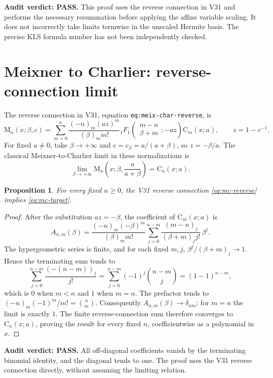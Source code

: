 \documentclass[11pt]{article}
\newtheorem{proposition}{Proposition}
\begin{document}
\noindent\textbf{Audit verdict: PASS.} This proof uses the reverse
connection in V31 and performs the necessary resummation before
applying the affine variable scaling. It does not incorrectly take
limits termwise in the unscaled Hermite basis. The precise KLS
formula number has not been independently checked.


\section{Meixner to Charlier: reverse-connection limit}
The reverse connection in V31, equation \texttt{eq:meix-char-reverse}, is
\begin{equation}\label{eq:mc-reverse}
\mathrm M_n(x;\beta,c)=\sum_{m=0}^n
\frac{(-n)_m(az)^m}{(\beta)_m m!}
{}_1F_1\!\left(\begin{matrix}m-n\\\beta+m\end{matrix};-az\right)
\mathrm C_m(x;a),\qquad z=1-c^{-1}.
\end{equation}
For fixed $a\ne0$, take $\beta\to+\infty$ and
$c=c_\beta=a/(a+\beta)$, so $z=-\beta/a$. The classical
Meixner-to-Charlier limit in these normalizations is
\begin{equation}\label{eq:mc-target}
\lim_{\beta\to+\infty}\mathrm M_n\!\left(x;\beta,\frac{a}{a+\beta}\right)
=\mathrm C_n(x;a).
\end{equation}
\begin{proposition}
For every fixed $n\ge0$, the V31 reverse connection
\eqref{eq:mc-reverse} implies \eqref{eq:mc-target}.
\end{proposition}
\begin{proof}
After the substitution $az=-\beta$, the coefficient of
$\mathrm C_m(x;a)$ is
\[
A_{n,m}(\beta)=\frac{(-n)_m(-\beta)^m}{(\beta)_m m!}
\sum_{j=0}^{n-m}\frac{(m-n)_j}{(\beta+m)_j j!}\,\beta^j.
\]
The hypergeometric series is finite, and for each fixed $m,j$,
$\beta^j/(\beta+m)_j\to1$. Hence the terminating sum tends to
\[
\sum_{j=0}^{n-m}\frac{(-(n-m))_j}{j!}
=\sum_{j=0}^{n-m}(-1)^j\binom{n-m}{j}
=(1-1)^{n-m},
\]
which is $0$ when $m<n$ and $1$ when $m=n$.
The prefactor tends to $(-n)_m(-1)^m/m!=\binom nm$.
Consequently $A_{n,m}(\beta)\to\delta_{nm}$; for $m=n$ the
limit is exactly $1$. The finite reverse-connection sum therefore
converges to $\mathrm C_n(x;a)$, proving the result for every fixed
$n$, coefficientwise as a polynomial in $x$.
\end{proof}
\noindent\textbf{Audit verdict: PASS.} All off-diagonal coefficients
vanish by the terminating binomial identity, and the diagonal tends
to one. The proof uses the V31 reverse connection directly, without
assuming the limiting relation.
\end{document}
